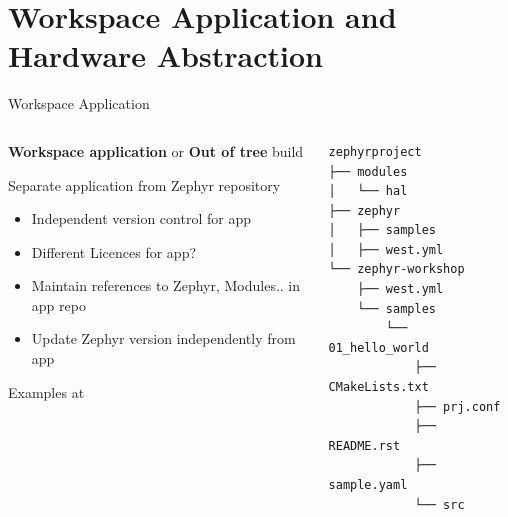\documentclass[10pt, aspectratio=169]{beamer}
\begin{document}
\section{Workspace Application and Hardware Abstraction}
\begin{frame}[fragile]{Workspace Application}
  \begin{columns}
    \begin{column}{0.6\textwidth}
      \textbf{Workspace application} or \textbf{Out of tree} build \footnotemark[1]

      Separate application from Zephyr repository
      \begin{itemize}
        \item Independent version control for app
        \item Different Licences for app?
        \item Maintain references to Zephyr, Modules.. in app repo
        \item Update Zephyr version independently from app
      \end{itemize}

      Examples at \footnotemark[2] \footnotemark[3]
    \end{column}
    \begin{column}{0.4\textwidth}
        {\fontsize{7}{7}\selectfont
          \begin{verbatim}
zephyrproject
├── modules
│   └── hal
├── zephyr
│   ├── samples
│   ├── west.yml
└── zephyr-workshop
    ├── west.yml
    └── samples
        └── 01_hello_world
            ├── CMakeLists.txt
            ├── prj.conf
            ├── README.rst
            ├── sample.yaml
            └── src
       \end{verbatim}
        }
    \end{column}
  \end{columns}
\end{frame}
\end{document}
